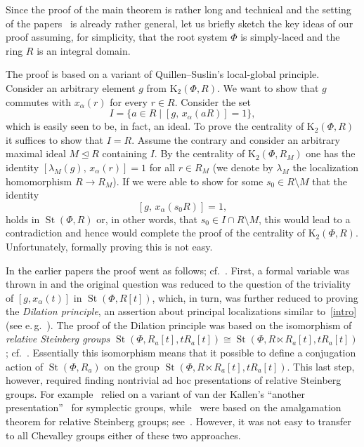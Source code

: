 \documentclass[oneside, 11pt]{amsart}
\numberwithin{equation}{section}
\theoremstyle{definition}
\theoremstyle{remark}
\DeclareMathOperator\St{St}
\begin{document}
Since the proof of the main theorem is rather long and technical and the setting of the papers~\cite{Vor1,Vor2} is already rather general, let us briefly sketch the key ideas of our proof assuming, for simplicity, that the root system $\Phi$ is simply-laced and the ring $R$ is an integral domain.

The proof is based on a variant of Quillen--Suslin's local-global principle.
Consider an arbitrary element $g$ from $\mathrm K_{2}(\Phi, R)$. We want to show that $g$ commutes with $x_{\alpha}(r)$ for every $r\in R$.
Consider the set \[I=\{a\in R\mid [g,\,x_{\alpha}(aR)]=1\},\] which is easily seen to be, in fact, an ideal. 
To prove the centrality of $\mathrm{K}_{2}(\Phi, R)$ it suffices to show that $I=R$.
Assume the contrary and consider an arbitrary maximal ideal $M \trianglelefteq R$ containing $I$. 
By the centrality of $\mathrm K_{2}(\Phi, R_M)$ one has the identity $[\lambda_{M}(g),\,x_{\alpha}(r)]=1$ for all $r\in R_{M}$ (we denote by $\lambda_M$ the localization homomorphism $R \to R_M$). 
If we were able to show for some $s_0\in R\setminus M$ that the identity \begin{equation} \label{intro} [g,\,x_{\alpha}(s_0R)]=1, \end{equation} holds in $\St(\Phi, R)$ or, in other words, that $s_0\in I\cap R\setminus M$, this would lead to a contradiction and hence would complete the proof of the centrality of $\mathrm K_{2}(\Phi, R)$. Unfortunately, formally proving this is not easy. 

In the earlier papers the proof went as follows; cf.~\cite{Tul,Sin,LavSin,Lavlgp}.
First, a formal variable was thrown in and the original question was reduced to the question of the triviality of $[g, x_{\alpha}(t)]$ in $\St(\Phi, R[t])$, which, in turn, was further reduced to proving the {\it Dilation principle}, an assertion about principal localizations similar to~\eqref{intro} (see e.\,g.~\cite[Lemma~15]{Sin}). The proof of the Dilation principle was based on the isomorphism of {\it relative Steinberg groups} $\St(\Phi, R_a[t], tR_a[t]) \cong \St(\Phi, R \ltimes R_a[t], tR_a[t])$; cf.~\cite[Remark~3.12]{Sin}. Essentially this isomorphism means that it possible to define a conjugation action of $\St(\Phi, R_a)$ on the group $\St(\Phi, R\ltimes R_a[t], tR_a[t])$.
This last step, however, required finding nontrivial ad hoc presentations of relative Steinberg groups.
For example~\cite{Lavlgp} relied on a variant of van der Kallen's ``another presentation''~\cite{vdK} for symplectic groups, while~\cite{Sin, LavSin} were based on the amalgamation theorem for relative Steinberg groups; see~\cite[Theorem~9]{Sin}. However, it was not easy to transfer to all Chevalley groups either of these two approaches.
\end{document}

